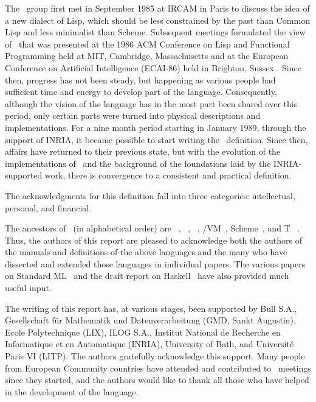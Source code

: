 \begin{foreword}
\label{history}
\begin{optDefinition}
The \eulisp\ group first met in September 1985 at IRCAM in Paris to discuss the
idea of a new dialect of Lisp, which should be less constrained by the past than
Common Lisp and less minimalist than Scheme.  Subsequent meetings formulated the
view of \eulisp\ that was presented at the 1986 ACM Conference on Lisp and
Functional Programming held at MIT, Cambridge, Massachusetts 
and at the European Conference on Artificial Intelligence (ECAI-86) held in
Brighton, Sussex .  Since then, progress has not been steady, but
happening as various people had sufficient time and energy to develop part of
the language.  Consequently, although the vision of the language has in the most
part been shared over this period, only certain parts were turned into physical
descriptions and implementations.  For a nine month period starting in January
1989, through the support of INRIA, it became possible to start writing the
\eulisp\ definition.  Since then, affairs have returned to their previous state,
but with the evolution of the implementations of \eulisp\ and the background of
the foundations laid by the INRIA-supported work, there is convergence to a
consistent and practical definition.
\end{optDefinition}

\begin{optDefinition}
The acknowledgments for this definition fall into three categories:
intellectual, personal, and financial.

The ancestors of \eulisp\ (in alphabetical order) are
\cl{}~,
\interlisp{}~,
\lelisp{}~,
\lisp/VM~, Scheme~,
and T~ .  Thus, the authors of
this report are pleased to acknowledge both the authors of the manuals and
definitions of the above languages and the many who have dissected and extended
those languages in individual papers.  The various papers on Standard
ML~ and the draft report on
Haskell~ have also provided much useful
input.

The writing of this report has, at various stages, been supported by Bull S.A.,
Gesellschaft f\"ur Mathematik und Datenverarbeitung (GMD, Sankt Augustin), Ecole
Polytechnique (LIX), ILOG S.A., Institut National de Recherche en Informatique
et en Automatique (INRIA), University of Bath, and Universit\'e Paris VI (LITP).
The authors gratefully acknowledge this support.  Many people from European
Community countries have attended and contributed to \eulisp\ meetings since
they started, and the authors would like to thank all those who have helped in
the development of the language.


\end{optDefinition}
\end{foreword}
